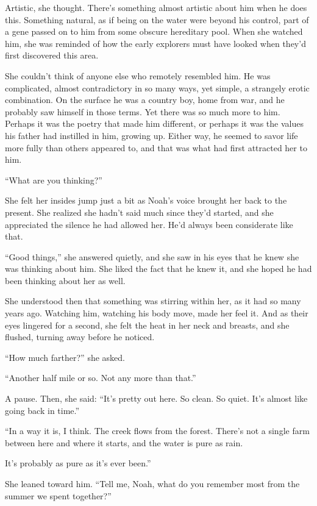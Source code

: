 \documentclass[10pt, twoside, openright]{book}
\begin{document}
Artistic, she thought. There's something almost artistic about him when
he does this. Something natural, as if being on the water were beyond
his control, part of a gene passed on to him from some obscure
hereditary pool. When she watched him, she was reminded of how the early
explorers must have looked when they'd first discovered this area.

She couldn't think of anyone else who remotely resembled him. He was
complicated, almost contradictory in so many ways, yet simple, a
strangely erotic combination. On the surface he was a country boy, home
from war, and he probably saw himself in those terms. Yet there was so
much more to him. Perhaps it was the poetry that made him different, or
perhaps it was the values his father had instilled in him, growing up.
Either way, he seemed to savor life more fully than others appeared to,
and that was what had first attracted her to him.


``What are you thinking?''


She felt her insides jump just a bit as Noah's voice brought her back to
the present. She realized she hadn't said much since they'd started, and
she appreciated the silence he had allowed her. He'd always been
considerate like that.

``Good things,'' she answered quietly, and she saw in his eyes that he
knew she was thinking about him. She liked the fact that he knew it, and
she hoped he had been thinking about her as well.

She understood then that something was stirring within her, as it had so
many years ago. Watching him, watching his body move, made her feel it.
And as their eyes lingered for a second, she felt the heat in her neck
and breasts, and she flushed, turning away before he noticed.


``How much farther?'' she asked.

``Another half mile or so. Not any more than that.''


A pause. Then, she said: ``It's pretty out here. So clean. So quiet.
It's almost like going back in time.''

``In a way it is, I think. The creek flows from the forest. There's not
a single farm between here and where it starts, and the water is pure as
rain.

It's probably as pure as it's ever been.''

She leaned toward him. ``Tell me, Noah, what do you remember most from
the summer we spent together?''
\end{document}
